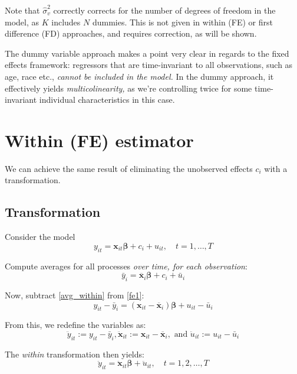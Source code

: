 \documentclass[11pt, a4paper]{report}
\theoremstyle{plain}
\theoremstyle{plain}
\theoremstyle{remark}
\begin{document}
Note that $\hat{\sigma}_{v}^{2}$ correctly corrects for the number of degrees of freedom in the model, as $K$ includes $N$ dummies. This is not given in within (FE) or first difference (FD) approaches, and requires correction, as will be shown.

The dummy variable approach makes a point very clear in regards to the fixed effects framework: regressors that are time-invariant to all observations, such as age, race etc., \textit{cannot be included in the model.} In the dummy approach, it effectively yields \textit{multicolinearity,} as we're controlling twice for some time-invariant individual characteristics in this case.


\section{Within (FE) estimator}

We can achieve the same result of eliminating the unobserved effects $c_i$ with a transformation. 

\subsection{Transformation}

Consider the model
\begin{equation}
    \label{fe1}
    y_{i t}=\mathbf{x}_{i t} \boldsymbol{\beta}+c_{i}+u_{i t}, \quad t=1, \ldots, T
\end{equation}

Compute averages for all processes \textit{over time, for each observation}:
\begin{equation}
    \label{avg_within}
    \bar{y}_{i}=\overline{\mathbf{x}}_{i} \boldsymbol{\beta}+c_{i}+\bar{u}_{i}
\end{equation}

Now, subtract \ref{avg_within} from \ref{fe1}:
\begin{equation}
    y_{i t}-\bar{y}_{i}=\left(\mathbf{x}_{i t}-\overline{\mathbf{x}}_{i}\right) \boldsymbol{\beta}+u_{i t}-\bar{u}_{i}
\end{equation}

From this, we redefine the variables as:
\begin{equation}
    \ddot{y}_{i t} := y_{i t}-\bar{y}_{i}, \ddot{\mathbf{x}}_{i t} := \mathbf{x}_{i t}-\overline{\mathbf{x}}_{i}, \text { and } \ddot{u}_{i t} := u_{i t}-\bar{u}_{i}
    \end{equation}

The \textit{within} transformation then yields:
\begin{equation}
    \label{within}
    \ddot{y}_{i t}=\ddot{\mathbf{x}}_{i t} \boldsymbol{\beta}+\ddot{u}_{i t}, \quad t=1,2, \ldots, T
\end{equation}
\end{document}
